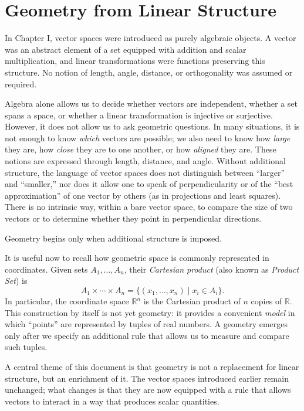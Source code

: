\chapter{Geometry from Linear Structure}

In Chapter I, vector spaces were introduced as purely algebraic objects.
A vector was an abstract element of a set equipped with addition and scalar multiplication,
and linear transformations were functions preserving this structure.
No notion of length, angle, distance, or orthogonality was assumed or required.

\medskip

Algebra alone allows us to decide whether vectors are independent,
whether a set spans a space,
or whether a linear transformation is injective or surjective.
However, it does not allow us to ask geometric questions.
In many situations, it is not enough to know \emph{which} vectors are possible;
we also need to know how \emph{large} they are, how \emph{close} they are to one
another, or how \emph{aligned} they are.
These notions are expressed through length, distance, and angle.
Without additional structure, the language of vector spaces does not distinguish
between ``larger'' and ``smaller,'' nor does it allow one to speak of
perpendicularity or of the ``best approximation'' of one vector by others
(as in projections and least squares).
There is no intrinsic way, within a bare vector space, to compare the size of
two vectors or to determine whether they point in perpendicular directions.

\medskip

Geometry begins only when additional structure is imposed.

\medskip

It is useful now to recall how geometric space is commonly represented in
coordinates.
Given sets $A_1,\dots,A_n$, their \emph{Cartesian product}
(also known as \emph{Product Set}) is
\[
A_1\times\cdots\times A_n = \{(x_1,\dots,x_n)\mid x_i\in A_i\}.
\]
In particular, the coordinate space $\mathbb{R}^n$ is the Cartesian product of
$n$ copies of $\mathbb{R}$.
This construction by itself is not yet geometry: it provides a convenient
\emph{model} in which ``points'' are represented by tuples of real numbers.
A geometry emerges only after we specify an additional rule that allows us to
measure and compare such tuples.

\medskip

A central theme of this document is that geometry is not a replacement for
linear structure, but an enrichment of it.
The vector spaces introduced earlier remain unchanged;
what changes is that they are now equipped with a rule that allows vectors to
interact in a way that produces scalar quantities.

